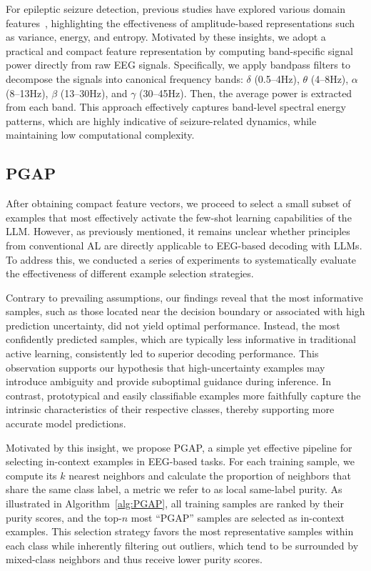 \documentclass[journal,twocolumn]{IEEEtran}
\begin{document}
For epileptic seizure detection, previous studies have explored various domain features~\cite{wang2023tasa,boonyakitanont2020review}, highlighting the effectiveness of amplitude-based representations such as variance, energy, and entropy. Motivated by these insights, we adopt a practical and compact feature representation by computing band-specific signal power directly from raw EEG signals. Specifically, we apply bandpass filters to decompose the signals into canonical frequency bands: $\delta$ (0.5–4Hz), $\theta$ (4–8Hz), $\alpha$ (8–13Hz), $\beta$ (13–30Hz), and $\gamma$ (30–45Hz). Then, the average power is extracted from each band. This approach effectively captures band-level spectral energy patterns, which are highly indicative of seizure-related dynamics, while maintaining low computational complexity.

\subsection{PGAP}
\label{subsec:PGAP}

After obtaining compact feature vectors, we proceed to select a small subset of examples that most effectively activate the few-shot learning capabilities of the LLM. However, as previously mentioned, it remains unclear whether principles from conventional AL are directly applicable to EEG-based decoding with LLMs. To address this, we conducted a series of experiments to systematically evaluate the effectiveness of different example selection strategies.

Contrary to prevailing assumptions, our findings reveal that the most informative samples, such as those located near the decision boundary or associated with high prediction uncertainty, did not yield optimal performance. Instead, the most confidently predicted samples, which are typically less informative in traditional active learning, consistently led to superior decoding performance. This observation supports our hypothesis that high-uncertainty examples may introduce ambiguity and provide suboptimal guidance during inference. In contrast, prototypical and easily classifiable examples more faithfully capture the intrinsic characteristics of their respective classes, thereby supporting more accurate model predictions.

Motivated by this insight, we propose PGAP, a simple yet effective pipeline for selecting in-context examples in EEG-based tasks. For each training sample, we compute its $k$ nearest neighbors and calculate the proportion of neighbors that share the same class label, a metric we refer to as local same-label purity. As illustrated in Algorithm~\ref{alg:PGAP}, all training samples are ranked by their purity scores, and the top-$n$ most “PGAP” samples are selected as in-context examples. This selection strategy favors the most representative samples within each class while inherently filtering out outliers, which tend to be surrounded by mixed-class neighbors and thus receive lower purity scores.
\end{document}
